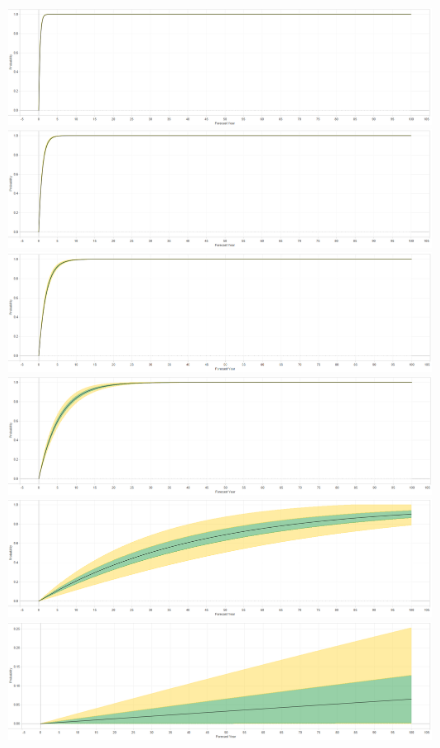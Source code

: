 \documentclass[letterpaper,10pt,oneside,final,onecolumn]{article}
\begin{document}
	\begin{figure}
		\centering
		\includegraphics[keepaspectratio=true,scale=0.20]{../images/Forecast00000Crop.png}
		\includegraphics[keepaspectratio=true,scale=0.20]{../images/Forecast00001Crop.png}
		\includegraphics[keepaspectratio=true,scale=0.20]{../images/Forecast00010Crop.png}
		\includegraphics[keepaspectratio=true,scale=0.20]{../images/Forecast00100Crop.png}
		\includegraphics[keepaspectratio=true,scale=0.20]{../images/Forecast01000Crop.png}
		\includegraphics[keepaspectratio=true,scale=0.20]{../images/Forecast10000Crop.png}

\end{figure}
\end{document}
